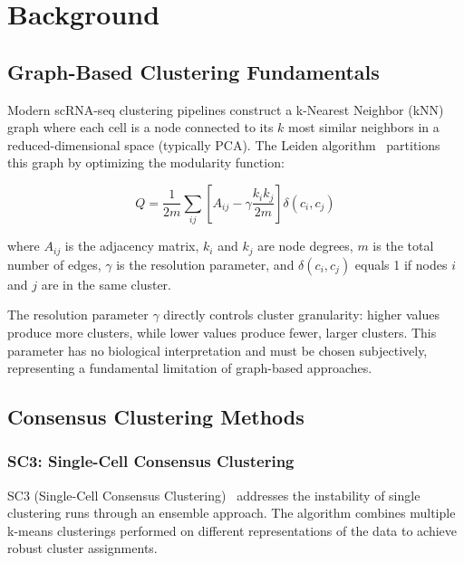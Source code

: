
\section{Background}
\label{sec:background}

\subsection{Graph-Based Clustering Fundamentals}

Modern scRNA-seq clustering pipelines construct a k-Nearest Neighbor (kNN) graph where each cell is a node connected to its $k$ most similar neighbors in a reduced-dimensional space (typically PCA). The Leiden algorithm~\cite{traag2019leiden} partitions this graph by optimizing the modularity function:

\begin{equation}
    Q = \frac{1}{2m}\sum_{ij}\left[A_{ij} - \gamma\frac{k_i k_j}{2m}\right]\delta(c_i, c_j)
    \label{eq:modularity}
\end{equation}

where $A_{ij}$ is the adjacency matrix, $k_i$ and $k_j$ are node degrees, $m$ is the total number of edges, $\gamma$ is the resolution parameter, and $\delta(c_i, c_j)$ equals 1 if nodes $i$ and $j$ are in the same cluster.

The resolution parameter $\gamma$ directly controls cluster granularity: higher values produce more clusters, while lower values produce fewer, larger clusters. This parameter has no biological interpretation and must be chosen subjectively, representing a fundamental limitation of graph-based approaches.

\subsection{Consensus Clustering Methods}

\subsubsection{SC3: Single-Cell Consensus Clustering}

SC3 (Single-Cell Consensus Clustering)~\cite{kiselev2017sc3} addresses the instability of single clustering runs through an ensemble approach. The algorithm combines multiple k-means clusterings performed on different representations of the data to achieve robust cluster assignments.

